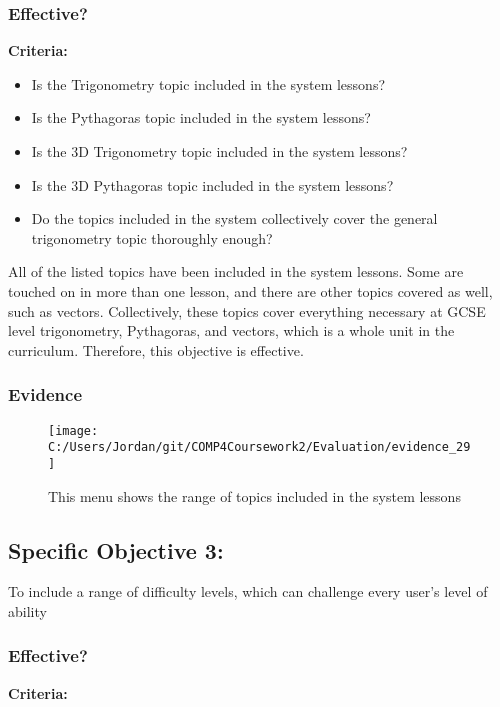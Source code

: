 \subsubsection{Effective?}

\textbf{Criteria: }

\begin{itemize}
	\item Is the Trigonometry topic included in the system lessons?
	\item Is the Pythagoras topic included in the system lessons?
	\item Is the 3D Trigonometry topic included in the system lessons?
	\item Is the 3D Pythagoras topic included in the system lessons?
	\item Do the topics included in the system collectively cover the general trigonometry topic thoroughly enough?
\end{itemize}

All of the listed topics have been included in the system lessons. Some are touched on in more than one lesson, and there are other topics covered as well, such as vectors. Collectively, these topics cover everything necessary at GCSE level trigonometry, Pythagoras, and vectors, which is a whole unit in the curriculum. Therefore, this objective is effective.

\subsubsection{Evidence}

\begin{figure}[H]
	\texttt{[image: C:/Users/Jordan/git/COMP4Coursework2/Evaluation/evidence\_29]}
	\caption{This menu shows the range of topics included in the system lessons}
\end{figure}

\subsection{Specific Objective 3: }

To include a range of difficulty levels, which can challenge every user's level of ability

\subsubsection{Effective?}

\textbf{Criteria: }

